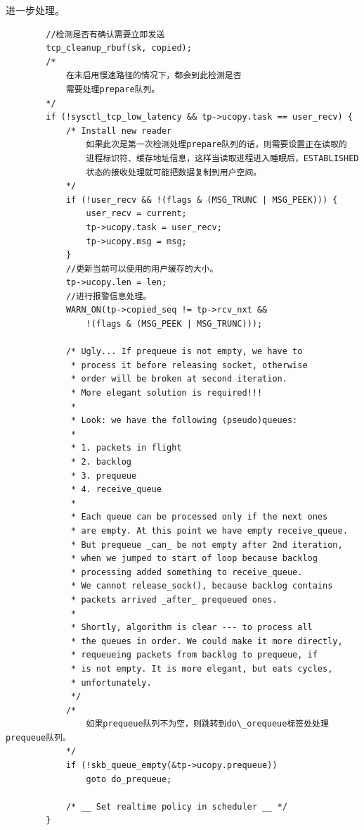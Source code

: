     进一步处理。
\begin{verbatim}
        //检测是否有确认需要立即发送
        tcp_cleanup_rbuf(sk, copied);
        /*
            在未启用慢速路径的情况下，都会到此检测是否
            需要处理prepare队列。
        */      
        if (!sysctl_tcp_low_latency && tp->ucopy.task == user_recv) {
            /* Install new reader 
                如果此次是第一次检测处理prepare队列的话，则需要设置正在读取的
                进程标识符、缓存地址信息，这样当读取进程进入睡眠后，ESTABLISHED
                状态的接收处理就可能把数据复制到用户空间。          
            */
            if (!user_recv && !(flags & (MSG_TRUNC | MSG_PEEK))) {
                user_recv = current;
                tp->ucopy.task = user_recv;
                tp->ucopy.msg = msg;
            }
            //更新当前可以使用的用户缓存的大小。
            tp->ucopy.len = len;
            //进行报警信息处理。
            WARN_ON(tp->copied_seq != tp->rcv_nxt &&
                !(flags & (MSG_PEEK | MSG_TRUNC)));

            /* Ugly... If prequeue is not empty, we have to
             * process it before releasing socket, otherwise
             * order will be broken at second iteration.
             * More elegant solution is required!!!
             *
             * Look: we have the following (pseudo)queues:
             *
             * 1. packets in flight
             * 2. backlog
             * 3. prequeue
             * 4. receive_queue
             *
             * Each queue can be processed only if the next ones
             * are empty. At this point we have empty receive_queue.
             * But prequeue _can_ be not empty after 2nd iteration,
             * when we jumped to start of loop because backlog
             * processing added something to receive_queue.
             * We cannot release_sock(), because backlog contains
             * packets arrived _after_ prequeued ones.
             *
             * Shortly, algorithm is clear --- to process all
             * the queues in order. We could make it more directly,
             * requeueing packets from backlog to prequeue, if
             * is not empty. It is more elegant, but eats cycles,
             * unfortunately.
             */
            /*
                如果prequeue队列不为空，则跳转到do\_orequeue标签处处理prequeue队列。            
            */
            if (!skb_queue_empty(&tp->ucopy.prequeue))
                goto do_prequeue;

            /* __ Set realtime policy in scheduler __ */
        }
\end{verbatim}
    
